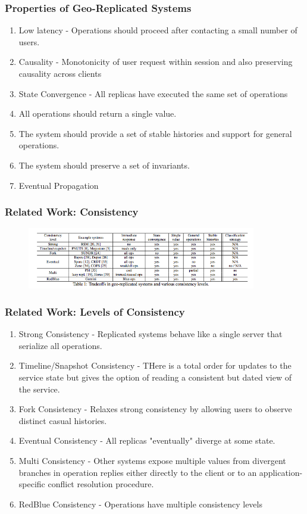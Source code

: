 \documentclass{beamer}
\begin{document}

\begin{frame}
\frametitle{Properties of Geo-Replicated Systems}
\begin{enumerate}
\item Low latency - Operations should proceed after contacting a small number of users.
\item Causality - Monotonicity of user request within session and also preserving causality across clients
\item State Convergence - All replicas have executed the same set of operations
\item All operations should return a single value.
\item The system should provide a set of stable histories and support for general operations.
\item The system should preserve a set of invariants.
\item Eventual Propagation
\end{enumerate}
\end{frame}

\begin{frame}
\frametitle{Related Work: Consistency}
\begin{figure}[t]
\includegraphics[width=10cm]{pic1.jpg}
\centering
\end{figure}
\end{frame}


\begin{frame}
\frametitle{Related Work: Levels of Consistency}
\begin{enumerate}
\item Strong Consistency - Replicated systems behave like a single server that serialize all operations.
\item Timeline/Snapshot Consistency - THere is a total order for updates to the service state but gives the option of reading a consistent but dated view of the service.
\item Fork Consistency - Relaxes strong consistency by allowing users to observe distinct casual histories.
\item Eventual Consistency - All replicas "eventually" diverge at some state.
\item Multi Consistency - Other systems expose multiple values from divergent branches in operation replies either directly to the client or to an application-specific conflict resolution procedure.
\item RedBlue Consistency - Operations have multiple consistency levels
\end{enumerate}

\end{frame}
\end{document}
